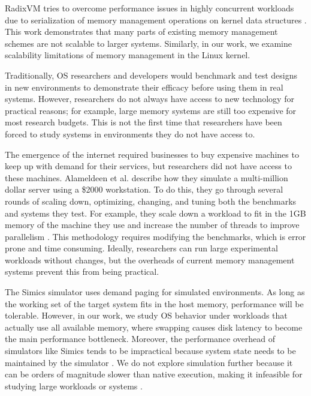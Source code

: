 \documentclass[twocolumn,11pt]{article}
\begin{document}
RadixVM tries to overcome performance issues in highly
concurrent workloads due to serialization of memory management operations on
kernel data structures \cite{radixvm}. This work demonstrates that many parts of
existing memory management schemes are not scalable to larger systems.
Similarly, in our work, we examine scalability limitations of memory
management in the Linux kernel. 

Traditionally, OS researchers and developers would benchmark and test 
designs in new environments to demonstrate their efficacy before using them in
real systems. However, researchers do not always have access to new technology
for practical reasons; for example, large memory systems are still too expensive
for most research budgets. This is not the first time that researchers have been
forced to study systems in environments they do not have access to.

The emergence of the internet required businesses to buy expensive machines to
keep up with demand for their services, but researchers did not have
access to these machines. Alameldeen et al. describe how they simulate a
multi-million dollar server using a \$2000 workstation. To do this, they go
through several rounds of scaling down, optimizing, changing, and tuning both
the benchmarks and systems they test. For example, they scale down a workload
to fit in the 1GB memory of the machine they use and increase the number of
threads to improve parallelism \cite{2kmachine}. This methodology requires modifying the benchmarks, which is error prone and
time consuming.  Ideally, researchers can run large experimental workloads
without changes, but the overheads of current memory management systems prevent
this from being practical.



The Simics simulator uses demand paging for simulated environments.
As long as the working set of
the target system fits in the host memory, performance will be tolerable.
However, in our work, we study OS behavior under workloads that
actually use all available memory, where swapping causes disk latency to become the main
performance bottleneck. Moreover, the performance overhead of simulators like
Simics tends to be impractical because system state needs to be maintained by
the simulator \cite{simics}. We do not explore simulation further because it
can be orders of magnitude slower than native execution, making it infeasible
for studying large workloads or systems \cite{2kmachine}.
\end{document}
